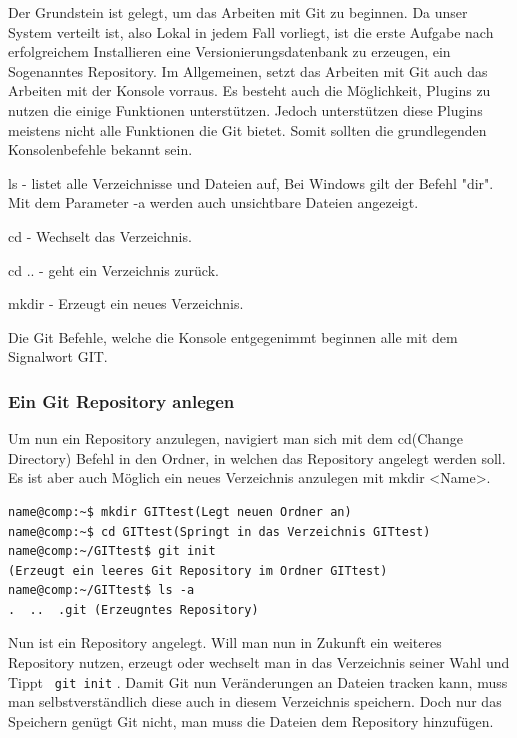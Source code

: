 \documentclass[12pt,a4paper,bibliography=totocnumbered,listof=totocnumbered]{scrartcl}
\begin{document}
Der Grundstein ist gelegt, um das Arbeiten mit Git zu beginnen. Da unser System verteilt ist, also Lokal in jedem Fall vorliegt, ist die erste Aufgabe nach erfolgreichem Installieren eine Versionierungsdatenbank zu erzeugen, ein Sogenanntes Repository. Im Allgemeinen, setzt das Arbeiten mit Git auch das Arbeiten mit der Konsole vorraus. Es besteht auch die Möglichkeit, Plugins zu nutzen die einige Funktionen unterstützen. Jedoch unterstützen diese Plugins meistens nicht alle Funktionen die Git bietet. Somit sollten die grundlegenden Konsolenbefehle bekannt sein.  
\begin{compactitem}
	\item ls - listet alle Verzeichnisse und Dateien auf, Bei Windows gilt der Befehl "dir". Mit dem Parameter -a werden auch unsichtbare Dateien angezeigt. 
	\item cd - Wechselt das Verzeichnis.
	\item cd .. - geht ein Verzeichnis zurück.
	\item mkdir - Erzeugt ein neues Verzeichnis. 
\end{compactitem}
Die Git Befehle, welche die Konsole entgegenimmt beginnen alle mit dem Signalwort GIT.  
\newpage 
\subsubsection{Ein Git Repository anlegen}
Um nun ein Repository anzulegen, navigiert man sich mit dem cd(Change Directory) Befehl in den Ordner, in welchen das Repository angelegt werden soll. Es ist aber auch Möglich ein neues Verzeichnis anzulegen mit mkdir <Name>. 

  \vspace{1em}
\begin{lstlisting}[caption=Git Repository anlegen, label=lst:arduino]
name@comp:~$ mkdir GITtest(Legt neuen Ordner an)
name@comp:~$ cd GITtest(Springt in das Verzeichnis GITtest)
name@comp:~/GITtest$ git init 
(Erzeugt ein leeres Git Repository im Ordner GITtest)
name@comp:~/GITtest$ ls -a
.  ..  .git (Erzeugntes Repository)

\end{lstlisting}

Nun ist ein Repository angelegt.
Will man nun in Zukunft ein weiteres Repository nutzen, erzeugt oder wechselt man in das Verzeichnis seiner Wahl und Tippt  \lstinline| git init| . Damit Git nun Veränderungen an Dateien tracken kann, muss man selbstverständlich diese auch in diesem Verzeichnis speichern. Doch nur das Speichern genügt Git nicht, man muss die Dateien dem Repository hinzufügen. 
\end{document}
